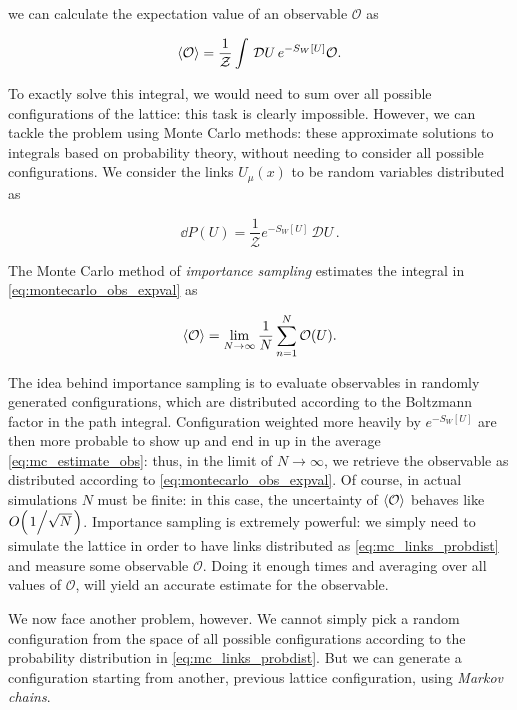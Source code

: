 \documentclass[reqno,12pt]{article}
\numberwithin{equation}{section}
\newcommand{\D}[1]{\,\mathcal{D}#1\,}
\newcommand{\Z}{\mathcal{Z}}
\begin{document}
we can calculate the expectation value of an observable $\mathcal{O}$ as

\begin{equation} \label{eq:montecarlo_obs_expval}
	\expval{\mathcal{O}} = \frac{1}{\Z} \int \D U e^{-S_W[U]} \mathcal{O}.
\end{equation}

To exactly solve this integral, we would need to sum over all possible configurations of the lattice: this task is
clearly impossible. However, we can tackle the problem using Monte Carlo methods: 
these approximate solutions to integrals based on probability theory, without needing
to consider all possible configurations. We consider the links $U_\mu(x)$ to be random variables distributed as

\begin{equation} \label{eq:mc_links_probdist}
	\dd{P(U)} = \frac{1}{\Z} e^{-S_W[U]} \D U.
\end{equation}

The Monte Carlo method of \textit{importance sampling} estimates the integral in \eqref{eq:montecarlo_obs_expval} as

\begin{equation} \label{eq:mc_estimate_obs}
	\expval{\mathcal{O}} = \lim_{N \rightarrow \infty} \frac{1}{N} \sum_{n=1}^N \mathcal{O}(U).
\end{equation}

The idea behind importance sampling is to evaluate observables in randomly generated configurations, which are
distributed according to the Boltzmann factor in the path integral. Configuration weighted more heavily by $e^{-S_W[U]}$
are then more probable to show up and end in up in the average \eqref{eq:mc_estimate_obs}: thus, in the limit of
$N \rightarrow \infty$, we retrieve the observable as distributed according to \eqref{eq:montecarlo_obs_expval}. Of course,
in actual simulations $N$ must be finite: in this case, the uncertainty of $\expval{\mathcal{O}}$ behaves like 
$O\qty(\flatfrac{1}{\sqrt{N}})$. Importance sampling is extremely powerful: we simply need to simulate the lattice
in order to have links distributed as \eqref{eq:mc_links_probdist} and measure some observable $\mathcal{O}$.
Doing it enough times and averaging over all values of $\mathcal{O}$, will yield an accurate estimate for the observable.

We now face another problem, however. We cannot simply pick a random configuration from the space of all possible
configurations according to the probability distribution in \eqref{eq:mc_links_probdist}. But we can
generate a configuration starting from another, previous lattice configuration, using \textit{Markov chains}.
\end{document}
